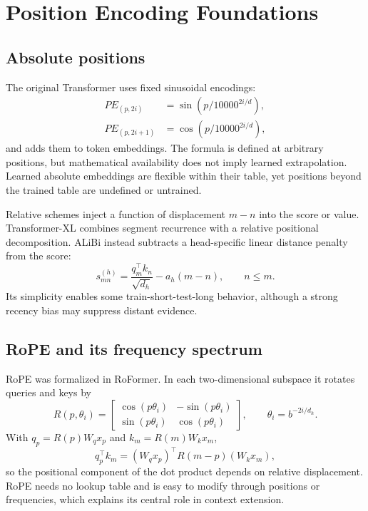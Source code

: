 \documentclass[UTF8,10pt,a4paper,fontset=none]{ctexart}
\begin{document}
\section{Position Encoding Foundations}

\subsection{Absolute positions}
The original Transformer uses fixed sinusoidal encodings\cite{vaswani2017}:
\begin{align}
PE_{(p,2i)}&=\sin(p/10000^{2i/d}),\\
PE_{(p,2i+1)}&=\cos(p/10000^{2i/d}),
\end{align}
and adds them to token embeddings. The formula is defined at arbitrary positions, but mathematical availability does not imply learned extrapolation. Learned absolute embeddings are flexible within their table, yet positions beyond the trained table are undefined or untrained.

Relative schemes inject a function of displacement $m-n$ into the score or value. Transformer-XL combines segment recurrence with a relative positional decomposition\cite{dai2019transformerxl}. ALiBi instead subtracts a head-specific linear distance penalty from the score\cite{press2021}:
\begin{equation}
s^{(h)}_{mn}=\frac{q_m^\top k_n}{\sqrt{d_h}}-a_h(m-n),\qquad n\le m.
\end{equation}
Its simplicity enables some train-short-test-long behavior, although a strong recency bias may suppress distant evidence.

\subsection{RoPE and its frequency spectrum}
RoPE was formalized in RoFormer\cite{su2021}. In each two-dimensional subspace it rotates queries and keys by
\begin{equation}
R(p,\theta_i)=\begin{bmatrix}\cos(p\theta_i)&-\sin(p\theta_i)\\
\sin(p\theta_i)&\cos(p\theta_i)\end{bmatrix},\qquad \theta_i=b^{-2i/d_h}.
\end{equation}
With $q_p=R(p)W_qx_p$ and $k_m=R(m)W_kx_m$,
\begin{equation}
q_p^\top k_m=(W_qx_p)^\top R(m-p)(W_kx_m),
\end{equation}
so the positional component of the dot product depends on relative displacement. RoPE needs no lookup table and is easy to modify through positions or frequencies, which explains its central role in context extension.
\end{document}
